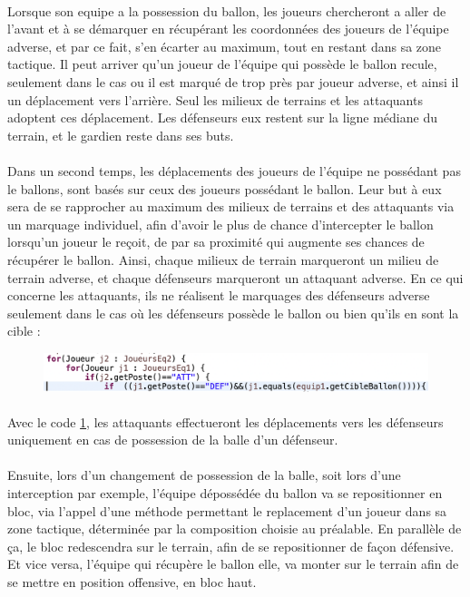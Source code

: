 \paragraph{}
    Lorsque son equipe a la possession du ballon, les joueurs chercheront a aller de l'avant et à se démarquer en récupérant les coordonnées des joueurs de l'équipe adverse, et par ce fait, s'en écarter au maximum, tout en restant dans sa zone tactique. Il peut arriver qu'un joueur de l'équipe qui possède le ballon recule, seulement dans le cas ou il est marqué de trop près par joueur adverse, et ainsi il un déplacement vers l'arrière. Seul les milieux de terrains et les attaquants adoptent ces déplacement. Les défenseurs eux restent sur la ligne médiane du terrain, et le gardien reste dans ses buts.
    
\paragraph{}
    Dans un second temps, les déplacements des joueurs de l'équipe ne possédant pas le ballons, sont basés sur ceux des joueurs possédant le ballon. Leur but à eux sera de se rapprocher au maximum des milieux de terrains et des attaquants via un marquage individuel, afin d'avoir le plus de chance d'intercepter le ballon lorsqu'un joueur le reçoit, de par sa proximité qui augmente ses chances de récupérer le ballon. Ainsi, chaque milieux de terrain marqueront un milieu de terrain adverse, et chaque défenseurs marqueront un attaquant adverse. En ce qui concerne les attaquants, ils ne réalisent le marquages des défenseurs adverse seulement dans le cas où les défenseurs possède le ballon ou bien qu'ils en sont la cible : 
    
\begin{figure}[h]
\centering
\includegraphics[width=15cm]{images/code_marquage.png}
\label{fig:marquage}
\end{figure}
       
\paragraph{}
    Avec le code \ref{fig:marquage}, les attaquants effectueront les déplacements vers les défenseurs uniquement en cas de possession de la balle d'un défenseur.

\paragraph{}
    Ensuite, lors d'un changement de possession de la balle, soit lors d'une interception par exemple, l'équipe dépossédée du ballon va se repositionner en bloc, via l'appel d'une méthode permettant le replacement d'un joueur dans sa zone tactique, déterminée par la composition choisie au préalable. En parallèle de ça, le bloc redescendra sur le terrain, afin de se repositionner de façon défensive. Et vice versa, l'équipe qui récupère le ballon elle, va monter sur le terrain afin de se mettre en position offensive, en bloc haut.
